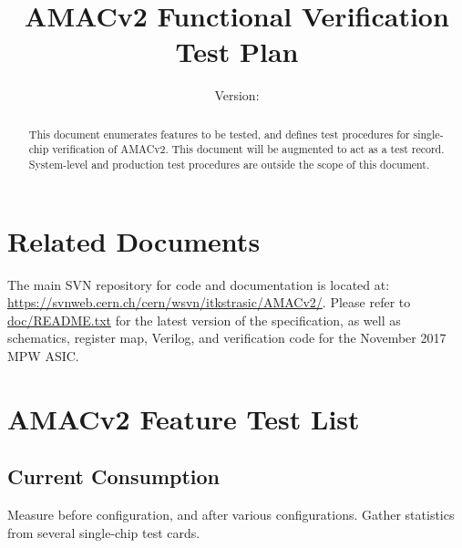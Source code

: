 \documentclass[11pt]{article}   			%
\title{AMACv2 Functional Verification Test Plan}
\author{Version: \Version}
\author{}
\begin{document}
\maketitle
\begin{abstract}

This document enumerates features to be tested, and defines test procedures for single-chip verification of AMACv2. This document will be augmented to act as a test record. System-level and production test procedures are outside 
the scope of this document.

\end{abstract}

\begin{versionhistory}
\end{versionhistory}

\newpage

\tableofcontents

\newpage

\section{Related Documents}

The main SVN repository for code and documentation is located at: \\
\href{https://svnweb.cern.ch/cern/wsvn/itkstrasic/AMACv2/}
{https://svnweb.cern.ch/cern/wsvn/itkstrasic/AMACv2/}. Please refer to 
\href{https://svnweb.cern.ch/cern/wsvn/itkstrasic/AMACv2/doc/README.txt}{doc/README.txt}
for the latest version of the specification, as well as schematics,
register map, Verilog, and verification code for the November 2017 MPW ASIC.

\newpage

\section{AMACv2 Feature Test List}

\subsection{Current Consumption}
Measure before configuration, and after various configurations. Gather statistics from 
several single-chip test cards.

\end{document}
